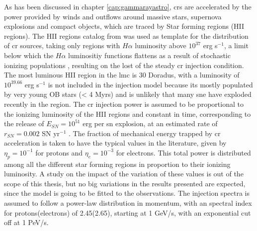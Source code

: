 \documentclass[main.tex]{subfiles}
\begin{document}
As has been discussed in chapter \ref{cap:gammarayastro}, \glspl{cr} are accelerated by the power provided by winds and outflows around massive stars, supernova explosions and compact objects, which are traced by Star forming regions (HII regions). The HII regions catalog from \cite{2012HIIinLMC} was used as template for the distribution of \gls{cr} sources, taking only regions with $H\alpha$ luminosity above $10^{37}$ erg s$^{-1}$, a limit below which the $H\alpha$ luminositiy functions flattens as a result of stochastic ionizing populations \cite{Halphaluminosiyfunctions}, resulting on the lost of the steady \gls{cr} injection condition. The most luminous HII region in the \gls{lmc} is 30 Doradus, with a luminosity of $10^{39.66}$ erg s$^{-1}$ is not included in the injection model because its mostly populated by very young OB stars (< 4 Myrs) \cite{201130Doradusstarforming} and is unlikely that many \gls{sne} have exploded recently in the region. The \gls{cr} injection power is assumed to be proportional to the ionizing luminosity of the HII regions and constant in time, corresponding to the release of $E_{SN} = 10^{51}$ erg per \gls{sn} explosion, at an estimated rate of $r_{SN} =  0.002$ SN yr$^{-1}$ \cite{1991SNrates}. The fraction of mechanical energy trapped by \gls{cr} acceleration is taken to have the typical values in the literature, given by $\eta_{p} = 10^{-1}$ for protons and $\eta_{e} = 10^{-3}$ for electrons. This total power is distributed among all the different star forming regions in proportion to their ionizing luminosity. A study on the impact of the variation of these values is out of the scope of this thesis, but no big variations in the results presented are expected, since the model is going to be fitted to the observations.
The injection spectra is assumed to follow a power-law distribution in momentum, with an spectral index for protons(electrons) of 2.45(2.65), starting at 1 GeV/s, with an exponential cut off at 1 PeV/s.\\
\end{document}
